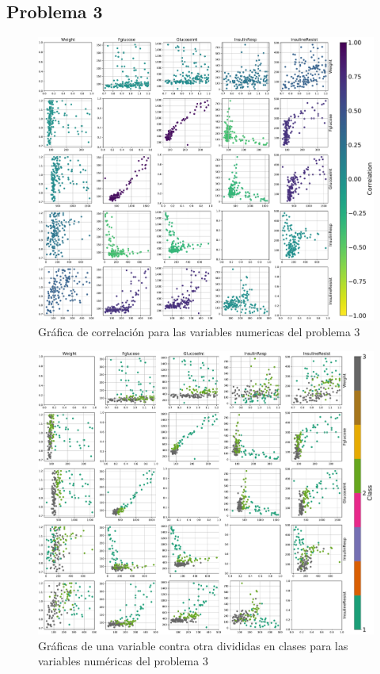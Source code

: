 \documentclass[11pt]{article}
\begin{document}
\subsection*{Problema 3}
\begin{figure}[H]
    \centering
    \includegraphics[width = 1.0\textwidth]{3-correlation.pdf}
    \caption{Gráfica de correlación para las variables numericas del problema 3}
    \label{3-correlation}
\end{figure}
\begin{figure}[H]
    \centering
    \includegraphics[width = 1.0\textwidth]{3-classes.pdf}
    \caption{Gráficas de una variable contra otra divididas en clases para las variables numéricas del problema 3}
    \label{3-classes}
\end{figure}
\end{document}

